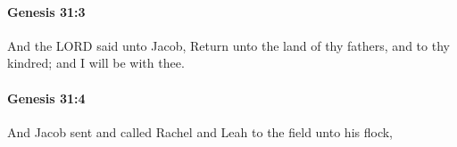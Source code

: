 		\paragraph{Genesis 31:3} %
			\label{GENESIS-31-3}

			And the LORD said unto Jacob, Return unto the land of thy fathers, and to thy kindred; and I will be with thee.


		\paragraph{Genesis 31:4} %
			\label{GENESIS-31-4}

			And Jacob sent and called Rachel and Leah to the field unto his flock,


